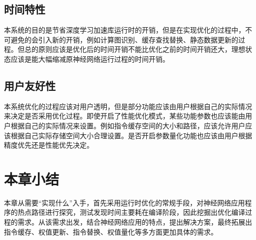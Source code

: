 \subsection {时间特性}
本系统的目的是节省深度学习加速库运行时的开销，但是在实现优化的过程中，不可避免的会引入新的开销，例如计算图识别、缓存查找替换、静态数据更新的过程。但总的原则应该是优化后的时间开销不能比优化之前的时间开销还大，理想状态应该是能大幅缩减原神经网络运行过程的时间开销。

\subsection {用户友好性}
本系统优化的过程应该对用户透明，但是部分功能应该由用户根据自己的实际情况来决定是否采用优化过程。即使开启了性能优化模式，某些功能参数也应该能由用户根据自己的实际情况来设置。例如指令缓存空间的大小和路径，应该允许用户应该根据自己实际存储空间大小合理设置。是否开启参数量化功能也应该由用户根据精度优先还是性能优先决定。

\section {本章小结}
本章从需要“实现什么”入手，首先采用运行时优化的常规手段，对神经网络应用程序的热点路径进行探究，测试发现时间主要耗在编译阶段，因此挖掘出优化编译过程的需求。从该需求出发，结合神经网络应用的特点，提出解决方案，最终拓展出指令缓存、权值更新、指令替换、权值量化等多方面更加具体的需求。